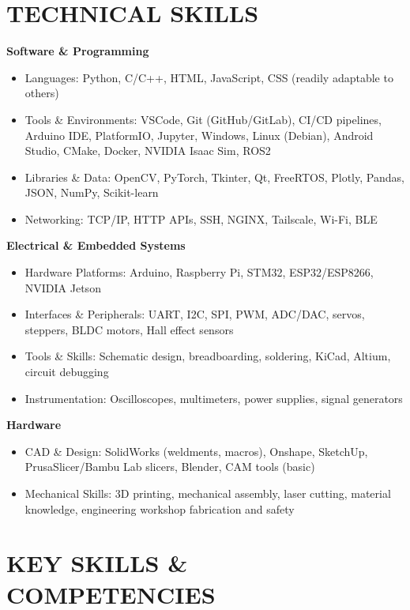 \documentclass[11pt, a4paper]{article}
\begin{document}
\section{TECHNICAL SKILLS}

\textbf{Software \& Programming}
\begin{itemize}
\item Languages: Python, C/C++, HTML, JavaScript, CSS (readily adaptable to others)
\item Tools \& Environments: VSCode, Git (GitHub/GitLab), CI/CD pipelines, Arduino
  IDE, PlatformIO, Jupyter, Windows, Linux (Debian), Android Studio, CMake, Docker,
  NVIDIA Isaac Sim, ROS2
\item Libraries \& Data: OpenCV, PyTorch, Tkinter, Qt, FreeRTOS, Plotly, Pandas,
  JSON, NumPy, Scikit-learn
\item Networking: TCP/IP, HTTP APIs, SSH, NGINX, Tailscale, Wi-Fi, BLE
\end{itemize}
\vspace{4pt}

\textbf{Electrical \& Embedded Systems}
\begin{itemize}
\item Hardware Platforms: Arduino, Raspberry Pi, STM32, ESP32/ESP8266, NVIDIA Jetson
\item Interfaces \& Peripherals: UART, I2C, SPI, PWM, ADC/DAC, servos, steppers,
  BLDC motors, Hall effect sensors
\item Tools \& Skills: Schematic design, breadboarding, soldering, KiCad, Altium,
  circuit debugging
\item Instrumentation: Oscilloscopes, multimeters, power supplies, signal generators
\end{itemize}
\vspace{4pt}

\textbf{Hardware}
\begin{itemize}
\item CAD \& Design: SolidWorks (weldments, macros), Onshape, SketchUp,
  PrusaSlicer/Bambu Lab slicers, Blender, CAM tools (basic)
\item Mechanical Skills: 3D printing, mechanical assembly, laser cutting, material
  knowledge, engineering workshop fabrication and safety
\end{itemize}

\section{KEY SKILLS \& COMPETENCIES}
\end{document}
